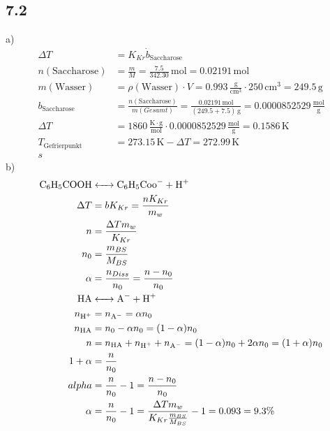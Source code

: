 \documentclass{article}
\begin{document}
\subsection*{7.2}
a)
\begin{align*}
    \Delta T &= K_{Kr} \dot b_{\text{Saccharose}}\\
    n(\text{Saccharose}) &= \frac{m}{M} = \frac{7.5}{342.30}\,\mathrm{mol} = 0.02191\,\mathrm{mol}\\
    m(\text{Wasser}) &= \rho(\text{Wasser}) \cdot V = 0.993\,\mathrm{\frac{g}{cm^3}} \cdot 250\,\mathrm{cm^3} = 249.5\,\mathrm{g}\\
    b_{\text{Saccharose}} &= \frac{n(\text{Saccharose})}{m(Gesamt)} = \frac{0.02191\,\mathrm{mol}}{(249.5 + 7.5)\,\mathrm{g}} = 0.0000852529\,\mathrm{\frac{mol}{g}}\\
    \Delta T &= 1860\,\mathrm{\frac{K \cdot g}{mol}} \cdot 0.0000852529 \,\mathrm{\frac{mol}{g}} = 0.1586\,\mathrm{K}\\
    T_{\text{Gefrierpunkt}} &= 273.15\,\mathrm{K} - \Delta T = 272.99\,\mathrm{K}\\s
\end{align*}
b)
\begin{align*}
    \ce{C6H5COOH &<-> C6H5Coo^{-} + H^{+}}\\
    \Delta T &= bK_{Kr} = \frac{nK_{Kr}}{m_w}\\
    n &= \frac{\Delta T m_w}{K_{Kr}}\\
    n_0 &= \frac{m_{BS}}{M_{BS}}\\
    \alpha &= \frac{n_{Diss}}{n_0} =  \frac{n-n_0}{n_0}\\
    \ce{HA &<-> A^- + H^+}\\
    n_{\ce{H^+}} &= n_{\ce{A^-}} = \alpha n_0\\
    n_{\ce{HA}} &= n_0 - \alpha n_0 = (1-\alpha)n_0\\
    n &= n_{\ce{HA}} + n_{\ce{H^+}} + n_{\ce{A^-}} = (1-\alpha) n_0 + 2 \alpha n_0 = (1 + \alpha) n_0\\
    1 + \alpha &= \frac{n}{n_0}\\
    alpha &= \frac{n}{n_0}-1 = \frac{n-n_0}{n_0}\\
    \alpha &= \frac{n}{n_0} - 1 = \frac{\Delta T m_w}{K_{Kr} \frac{m_{BS}}{M_{BS}}} - 1 = 0.093 = 9.3 \%
\end{align*}
\end{document}
